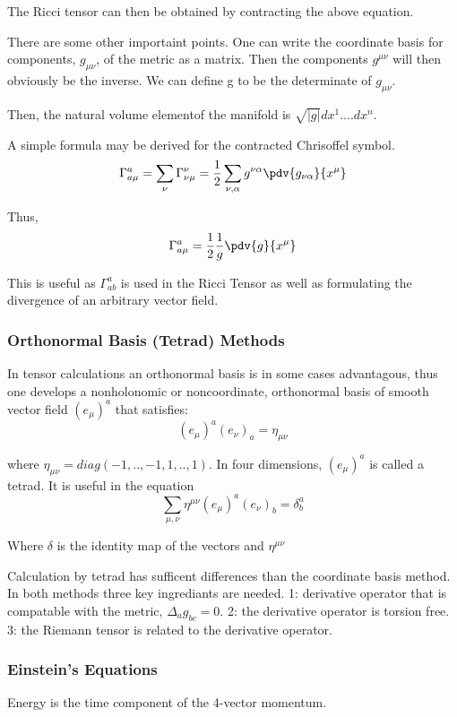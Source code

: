 The Ricci tensor can then be obtained by contracting the above equation.

There are some other importaint points. One can write the coordinate basis for components, $g_{\mu \nu}$, of the metric as a matrix. Then the components $g^{\mu \nu}$ will then obviously be the inverse. We can define g to be the determinate of $g_{\mu \nu}$.

Then, the natural volume elementof the manifold is $\sqrt{|g|}dx^1....dx^n$.

A simple formula may be derived for the contracted Chrisoffel symbol.
\[
\Gamma^a_{a \mu} = \sum_\nu \Gamma^\nu_{\nu \mu} = \frac 1 2 \sum_{\nu, \alpha} g^{\nu \alpha} \pdv{g_{\nu \alpha}}{x^\mu}
\]

Thus,
\[
\Gamma^a_{a \mu} = \frac 1 2 \frac{1}{g} \pdv{g}{x^\mu}
\]

This is useful as $\Gamma^a_{ab}$ is used in the Ricci Tensor as well as formulating the divergence of an arbitrary vector field.

\subsubsection{Orthonormal Basis (Tetrad) Methods}

In tensor calculations an orthonormal basis is in some cases advantagous, thus one develops a nonholonomic or noncoordinate, orthonormal basis of smooth vector field $(e_\mu)^a$ that satisfies:
\[
(e_\mu)^a(e_\nu)_a= \eta_{\mu \nu}
\]

where $\eta_{\mu \nu}= diag(-1,..,-1,1,..,1)$. In four dimensions, $(e_\mu)^a$ is called a tetrad. It is useful in the equation
\[
\sum_{\mu, \nu}\eta^{\mu \nu}(e_\mu)^a(e_\nu)_b = \delta^a_b
\]

Where $\delta$ is the identity map of the vectors and $\eta^{\mu \nu}$

Calculation by tetrad has sufficent differences than the coordinate basis method. In both methods three key ingrediants are needed. 1: derivative operator that is compatable with the metric, $\Delta_a g_{bc} = 0$. 2: the derivative operator is torsion free. 3: the Riemann tensor is related to the derivative operator.

\subsubsection{Einstein's Equations}
Energy is the time component of the 4-vector momentum.

